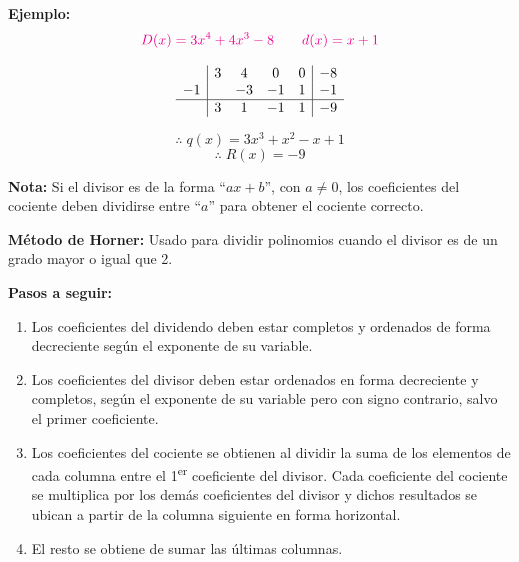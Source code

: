 \documentclass[11pt,a4paper]{article}
\newcommand{\cn}[1]{\raisebox{.5pt}{\textcircled{\raisebox{-.9pt}{\scriptsize #1}}}}
\begin{document}
\begin{center}
\end{center}

\textcolor{naranja}{\textbf{Ejemplo:}}
\[
\textcolor{magenta}{D(x) = 3x^4 + 4x^3 - 8} \qquad \textcolor{magenta}{d(x) = x + 1}
\]
\begin{minipage}{0.485\textwidth}
\[
\begin{array}{c|cccc|c}
   & 3 & 4  & 0  & 0 & -8\\
-1 &   & -3 & -1 & 1 & -1\\ \hline
   & 3 & 1  & -1 & 1 & -9
\end{array}
\]
\end{minipage}\hfill
\begin{minipage}{0.485\textwidth}
\[\therefore\; q(x) = 3x^3 + x^2 - x + 1\]
\[\therefore\; R(x) = -9\]
\end{minipage}

\medskip
\textbf{Nota:} Si el divisor es de la forma ``$ax + b$'', con $a \neq 0$, los coeficientes
del cociente deben dividirse entre ``$a$'' para obtener el cociente correcto.

\bigskip
\textcolor{verde}{\textbf{Método de Horner:}} Usado para dividir polinomios cuando el divisor
es de un grado mayor o igual que 2.

\textcolor{verde}{\textbf{Pasos a seguir:}}
\begin{enumerate}
  \item Los coeficientes del dividendo deben estar completos y ordenados de forma
  decreciente según el exponente de su variable.
  \item Los coeficientes del divisor deben estar ordenados en forma decreciente y
  completos, según el exponente de su variable pero con signo contrario, salvo el primer
  coeficiente.
  \item Los coeficientes del cociente se obtienen al dividir la suma de los elementos de
  cada columna entre el 1\textsuperscript{er} coeficiente del divisor. Cada coeficiente del
  cociente se multiplica por los demás coeficientes del divisor y dichos resultados se
  ubican a partir de la columna siguiente en forma horizontal.
  \item El resto se obtiene de sumar las últimas columnas.
\end{enumerate}
\end{document}
